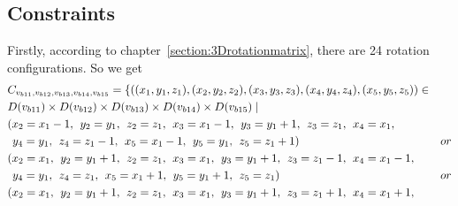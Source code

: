 \subsection{Constraints}
Firstly, according to chapter~\ref{section:3Drotationmatrix}, there are 24 rotation configurations. So we get
\begin{align*}
&\Cons{b11}{b12}{b13}{b14}{b15}=\{((x_{1},y_{1},z_{1}),(x_{2},y_{2},z_{2}),(x_{3},y_{3},z_{3}),(x_{4},y_{4},z_{4}),(x_{5},y_{5},z_{5}))\in \\
&\Domain {b11} \times \Domain{b12}\times \Domain{b13}\times \Domain{b14}\times \Domain{b15} \mid\\
&(x_{2}=x_{1}-1,\hspace{1ex} y_{2}=y_{1},\hspace{1ex} z_{2}=z_{1},\hspace{1ex} x_{3}=x_{1}-1,\hspace{1ex} y_{3}=y_{1}+1,\hspace{1ex} z_{3}=z_{1},\hspace{1ex} x_{4}=x_{1},\\
&\hspace{1ex} y_{4}=y_{1},\hspace{1ex} z_{4}=z_{1}-1,\hspace{1ex} x_{5}=x_{1}-1,\hspace{1ex} y_{5}=y_{1},\hspace{1ex} z_{5}=z_{1}+1)&or\\ 
&(x_{2}=x_{1},\hspace{1ex} y_{2}=y_{1}+1,\hspace{1ex} z_{2}=z_{1},\hspace{1ex} x_{3}=x_{1},\hspace{1ex} y_{3}=y_{1}+1,\hspace{1ex} z_{3}=z_{1}-1,\hspace{1ex} x_{4}=x_{1}-1,\\
&\hspace{1ex} y_{4}=y_{1},\hspace{1ex} z_{4}=z_{1},\hspace{1ex} x_{5}=x_{1}+1,\hspace{1ex} y_{5}=y_{1}+1,\hspace{1ex} z_{5}=z_{1})&or\\ 
&(x_{2}=x_{1},\hspace{1ex} y_{2}=y_{1}+1,\hspace{1ex} z_{2}=z_{1},\hspace{1ex} x_{3}=x_{1},\hspace{1ex} y_{3}=y_{1}+1,\hspace{1ex} z_{3}=z_{1}+1,\hspace{1ex} x_{4}=x_{1}+1,\\

\end{align*}
